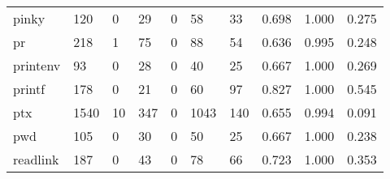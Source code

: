 \begin{longtable}{lp{2.0cm}p{2.0cm}p{2.0cm}p{2.0cm}p{2.0cm}p{2.0cm}p{2.0cm}p{2.0cm}p{2.0cm}}
pinky     &                    120 &                                  0 &                                29 &                                0 &                                58 &                              33 &                                0.698 &                                  1.000 &                                0.275 \\
pr        &                    218 &                                  1 &                                75 &                                0 &                                88 &                              54 &                                0.636 &                                  0.995 &                                0.248 \\
printenv  &                     93 &                                  0 &                                28 &                                0 &                                40 &                              25 &                                0.667 &                                  1.000 &                                0.269 \\
printf    &                    178 &                                  0 &                                21 &                                0 &                                60 &                              97 &                                0.827 &                                  1.000 &                                0.545 \\
ptx       &                   1540 &                                 10 &                               347 &                                0 &                              1043 &                             140 &                                0.655 &                                  0.994 &                                0.091 \\
pwd       &                    105 &                                  0 &                                30 &                                0 &                                50 &                              25 &                                0.667 &                                  1.000 &                                0.238 \\
readlink  &                    187 &                                  0 &                                43 &                                0 &                                78 &                              66 &                                0.723 &                                  1.000 &                                0.353 \\

\end{longtable}
